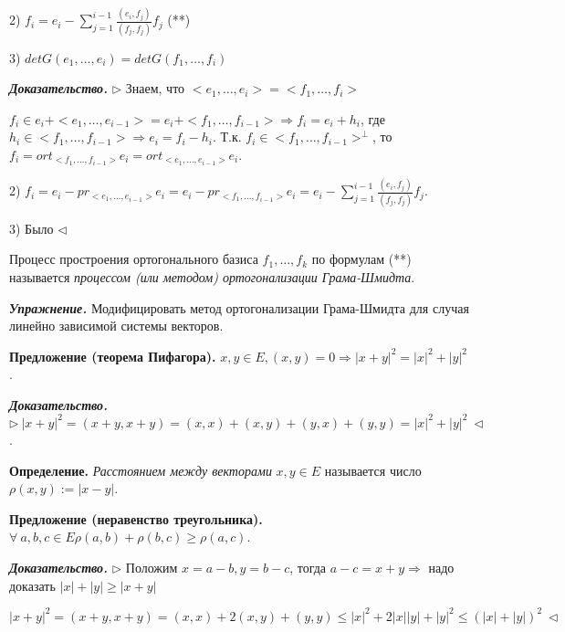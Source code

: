 2) $f_i = e_i - \sum\limits_{j=1}^{i-1} \frac{(e_i, f_j)}{(f_j, f_j)} f_j$ (**)

3) $det G(e_1, \dots, e_i) = det G(f_1, \dots, f_i)$

\vspace{\baselineskip}
\textbf{\textit{Доказательство.}} $\rhd$ Знаем, что $<e_1, \dots, e_i> = <f_1, \dots, f_i>$

$f_i \in e_i + <e_1, \dots, e_{i-1}> = e_i + <f_1, \dots, f_{i-1}> \Rightarrow f_i = e_i + h_i$, где $h_i \in <f_1, \dots, f_{i-1}> \Rightarrow e_i = f_i - h_i$. Т.к. $f_i \in <f_1, \dots, f_{i-1}>^{\bot}$, то $f_i = ort_{<f_1, \dots, f_{i-1}>} e_i = ort_{<e_1, \dots, e_{i-1}>} e_i$.

2) $f_i = e_i - pr_{<e_1, \dots, e_{i-1}>} e_i = e_i - pr_{<f_1, \dots, f_{i-1}>} e_i = e_i - \sum\limits_{j=1}^{i-1} \frac{(e_i, f_j)}{(f_j, f_j)} f_j$.

3) Было $\lhd$

\vspace{\baselineskip}
Процесс простроения ортогонального базиса $f_1, \dots, f_k$ по формулам (**) называется \textit{процессом (или методом) ортогонализации Грама-Шмидта}.

\vspace{\baselineskip}
\textbf{\textit{Упражнение.}} Модифицировать метод ортогонализации Грама-Шмидта для случая линейно зависимой системы векторов.

\vspace{\baselineskip}
\textbf{Предложение (теорема Пифагора).} $x, y \in E, (x, y) = 0 \Rightarrow |x+y|^2 = |x|^2 + |y|^2$.

\vspace{\baselineskip}
\textbf{\textit{Доказательство.}} $\rhd \ |x+y|^2 = (x+y, x+y) = (x,x) + (x,y) + (y,x) + (y,y) = |x|^2 + |y|^2 \ \lhd$.

\vspace{\baselineskip}
\textbf{Определение.} \textit{Расстоянием между векторами} $x, y \in E$ называется число $\rho (x, y) := |x - y|$. 

\vspace{\baselineskip}
\textbf{Предложение (неравенство треугольника).} $\forall \ a, b, c \in E \rho(a, b) + \rho(b, c) \geq \rho(a, c)$.

\vspace{\baselineskip}
\textbf{\textit{Доказательство.}} $\rhd$ Положим $x = a - b, y = b - c$, тогда $a - c = x + y \Rightarrow$  надо доказать $|x| + |y| \geq |x + y|$

$|x + y|^2 = (x+y, x+y) = (x,x) + 2(x,y) + (y,y) \leq |x|^2 + 2 |x| |y| + |y|^2 \leq (|x| + |y|)^2 \ \lhd$


